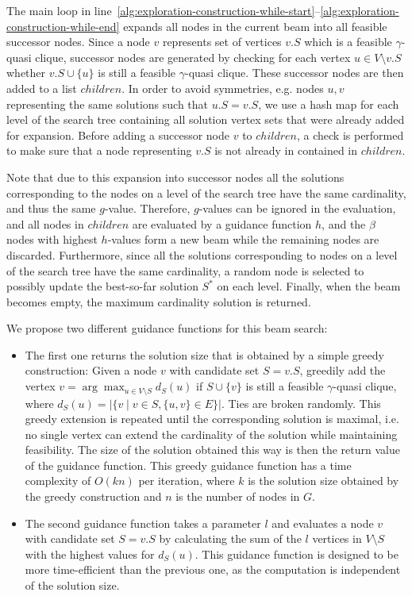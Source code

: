 \documentclass[draft,final]{vutinfth} %
\begin{document}
The main loop in line~\ref{alg:exploration-construction-while-start}--\ref{alg:exploration-construction-while-end} expands all nodes in the current beam into all feasible successor nodes. 
Since a node $v$ represents set of vertices $\mathit{v.S}$ which is a feasible $\gamma$-quasi clique, successor nodes are generated by checking for each vertex $u \in V \setminus \mathit{v.S}$ whether $\mathit{v.S} \cup \{u\}$ is still a feasible $\gamma$-quasi clique. 
These successor nodes are then added to a list $\mathit{children}$. 
In order to avoid symmetries, e.g. nodes $u,v$ representing the same solutions such that $u.S = v.S$, we use a hash map for each level of the search tree containing all solution vertex sets that were already added for expansion. Before adding a successor node $v$ to $\mathit{children}$, a check is performed to make sure that a node representing $v.S$ is not already in contained in $\mathit{children}$.  

Note that due to this expansion into successor nodes all the solutions corresponding to the nodes on a level of the search tree have the same cardinality, and thus the same $g$-value.  
Therefore, $g$-values can be ignored in the evaluation, and all nodes in $\mathit{children}$ are evaluated by a guidance function $h$, and the $\beta$ nodes with highest $h$-values form a new beam while the remaining nodes are discarded. 
Furthermore, since all the solutions corresponding to nodes on a level of the search tree have the same cardinality, a random node is selected to possibly update the best-so-far solution $S^*$ on each level.
Finally, when the beam becomes empty, the maximum cardinality solution is returned. 

We propose two different guidance functions for this beam search: 
\begin{itemize}
    \item The first one returns the solution size that is obtained by a simple greedy construction: Given a node $v$ with candidate set $S = v.S$, greedily add the vertex $v = \arg \max_{u \in V \setminus S} d_S(u)$ if $S \cup \{v\}$ is still a feasible $\gamma$-quasi clique, where $d_S(u) = |\{v \mid v \in S, \{u,v\} \in E \}|$. 
    Ties are broken randomly. This greedy extension is repeated until the corresponding solution is maximal, i.e. no single vertex can extend the cardinality of the solution while maintaining feasibility. 
    The size of the solution obtained this way is then the return value of the guidance function. This greedy guidance function has a time complexity of $O(kn)$ per iteration, where $k$ is the solution size obtained by the greedy construction and $n$ is the number of nodes in $G$. 
    \item The second guidance function takes a parameter $l$ and evaluates a node $v$ with candidate set $S = v.S$ by calculating the sum of the $l$ vertices in $V \setminus S$ with the highest values for $d_S(u)$. This guidance function is designed to be more time-efficient than the previous one, as the computation is independent of the solution size. 
\end{itemize}
\end{document}
